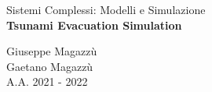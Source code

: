 \begin{titlepage}
  \vfill
  {\Large Sistemi Complessi: Modelli e Simulazione}\\[1cm]
  {\LARGE\bfseries Tsunami Evacuation Simulation}\\[0.4cm]
  \vfill


  \large
  Giuseppe Magazzù \\
  Gaetano Magazzù \\[1cm]


  {\large A.A. 2021 - 2022}\\[2cm]

\end{titlepage}
